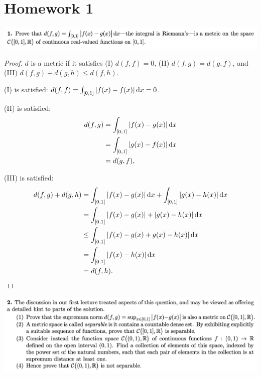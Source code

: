 \section{Homework 1}

\begin{mdframed}
\includegraphics[width=400pt]{img/analysis--berkeley-202a--homework-1-a75a.png}
\end{mdframed}


\begin{proof}
  $d$ is a metric if it satisfies (I) $d(f,f) = 0$, (II) $d(f,g) = d(g, f)$, and (III) $d(f,g) + d(g, h) \le d(f, h)$.

  (I) is satisfied: $d(f, f) = \int_{[0,1]}|f(x) - f(x)| \dx = 0$.

  (II) is satisfied:
\begin{align*}
  d(f, g)
  &= \int_{[0,1]}|f(x) - g(x)| \dx \\
  &= \int_{[0,1]}|g(x) - f(x)| \dx \\
  &= d(g, f),
\end{align*}

  (III) is satisfied:
\begin{align*}
  d(f, g) + d(g, h)
  &= \int_{[0,1]} |f(x) - g(x)| \dx + \int_{[0,1]} |g(x) - h(x)| \dx \\
  &= \int_{[0,1]} |f(x) - g(x)| + |g(x) - h(x)| \dx \\
  &\le \int_{[0,1]} |f(x) - g(x) + g(x) - h(x)| \dx \\
  &= \int_{[0,1]} |f(x) - h(x)| \dx \\
  &= d(f, h).
\end{align*}
\end{proof}

\newpage
\begin{mdframed}
\includegraphics[width=400pt]{img/analysis--berkeley-202a--homework-1-d1d3.png}
\end{mdframed}


